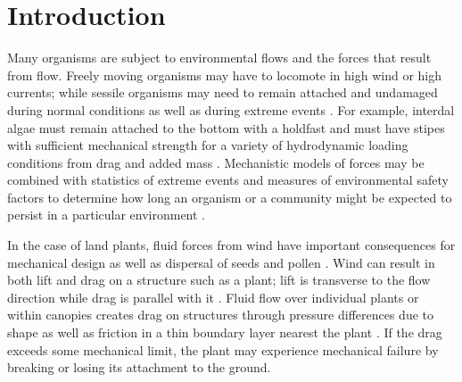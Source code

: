 \section{Introduction}
Many organisms are subject to environmental flows and the forces that result from flow. Freely moving organisms may have to locomote in high wind or high currents; while sessile organisms may need to remain attached and undamaged during normal conditions as well as during extreme events \citep{vogel1994life, vogel2003comparative}. For example, interdal algae must remain attached to the bottom with a holdfast and must have stipes with sufficient mechanical strength for a variety of hydrodynamic loading conditions from drag and added mass \citep{carrington1992consequences, denny2002mechanics, stewart2004hydrodynamic, stewart2006hydrodynamic, boller2007interspecific}. Mechanistic models of forces may be combined with statistics of extreme events and measures of environmental safety factors to determine how long an organism or a community might be expected to persist in a particular environment \citep{denny2009on}. 

In the case of land plants, fluid forces from wind have important consequences for mechanical design \citep{delangre2008effects} as well as dispersal of seeds and pollen \citep{vogel2003comparative, evangelista2011explosive, stevenson2015when}. Wind can result in both lift and drag on a structure such as a plant; lift is transverse to the flow direction while drag is parallel with it \citep{vogel1994life, vogel2003comparative, kundu2012fluid}. Fluid flow over individual plants or within canopies creates drag on structures through pressure differences due to shape as well as friction in a thin boundary layer nearest the plant \citep{delangre2008effects, shapiro1961shape, kundu2012fluid, vogel1994life, vogel2003comparative}. If the drag exceeds some mechanical limit, the plant may experience mechanical failure by breaking or losing its attachment to the ground. 

